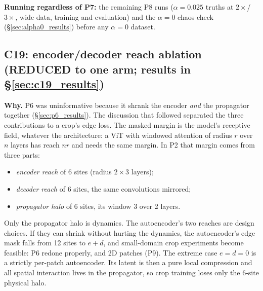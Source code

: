 \documentclass[11pt]{article}
\begin{document}
\textbf{Running regardless of P7:} the remaining P8 runs
($\alpha{=}0.025$ truths at $2\times$/$3\times$, wide data, training
and evaluation) and the $\alpha{=}0$ chaos check
(\S\ref{sec:alpha0_results}) before any $\alpha{=}0$ dataset.

\subsection{C19: encoder/decoder reach ablation (REDUCED to one arm; results in \S\ref{sec:c19_results})}
\label{sec:c19}

\textbf{Why.} P6 was uninformative because it shrank the encoder
\emph{and} the propagator together (\S\ref{sec:p6_results}). The
discussion that followed separated the three contributions to a crop's
edge loss. The masked margin is the model's receptive field, whatever
the architecture: a ViT with windowed attention of radius $r$ over $n$
layers has reach $nr$ and needs the same margin. In P2 that margin
comes from three parts:
\begin{itemize}[leftmargin=*]
\item \emph{encoder reach} of 6 sites (radius $2\times3$ layers);
\item \emph{decoder reach} of 6 sites, the same convolutions mirrored;
\item \emph{propagator halo} of 6 sites, its window 3 over 2 layers.
\end{itemize}
Only the propagator halo is dynamics. The autoencoder's two reaches are
design choices. If they can shrink without hurting the dynamics, the
autoencoder's edge mask falls from 12 sites to $e{+}d$, and
small-domain crop experiments become feasible: P6 redone properly, and
2D patches (P9). The extreme case $e{=}d{=}0$ is a strictly per-patch
autoencoder. Its latent is then a pure local compression and all
spatial interaction lives in the propagator, so crop training loses only
the 6-site physical halo.
\end{document}
